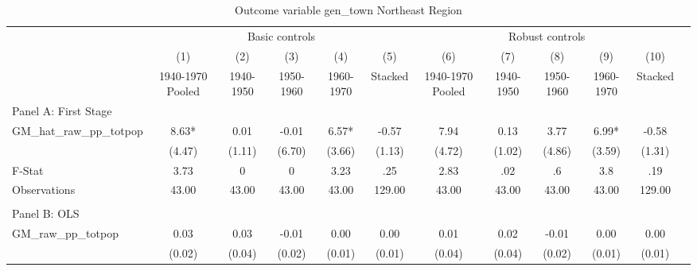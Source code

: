  \begin{table}[htbp]\centering {} \begin{threeparttable} \caption{Outcome variable gen\_town Northeast Region} \begin{tabular}{l*{11}{c}} \toprule
          &\multicolumn{5}{c}{Basic controls}                                   &\multicolumn{5}{c}{Robust controls}                                  \\\cmidrule(lr){2-6}\cmidrule(lr){7-11}
          &\multicolumn{1}{c}{(1)}&\multicolumn{1}{c}{(2)}&\multicolumn{1}{c}{(3)}&\multicolumn{1}{c}{(4)}&\multicolumn{1}{c}{(5)}&\multicolumn{1}{c}{(6)}&\multicolumn{1}{c}{(7)}&\multicolumn{1}{c}{(8)}&\multicolumn{1}{c}{(9)}&\multicolumn{1}{c}{(10)}\\
          &\multicolumn{1}{c}{1940-1970 Pooled}&\multicolumn{1}{c}{1940-1950}&\multicolumn{1}{c}{1950-1960}&\multicolumn{1}{c}{1960-1970}&\multicolumn{1}{c}{Stacked}&\multicolumn{1}{c}{1940-1970 Pooled}&\multicolumn{1}{c}{1940-1950}&\multicolumn{1}{c}{1950-1960}&\multicolumn{1}{c}{1960-1970}&\multicolumn{1}{c}{Stacked}\\
\cmidrule(lr){1-11}
\multicolumn{10}{l}{Panel A: First Stage}\\
\cmidrule(lr){1-11}
GM\_hat\_raw\_pp\_totpop&      8.63*  &      0.01   &     -0.01   &      6.57*  &     -0.57   &      7.94   &      0.13   &      3.77   &      6.99*  &     -0.58   \\
          &    (4.47)   &    (1.11)   &    (6.70)   &    (3.66)   &    (1.13)   &    (4.72)   &    (1.02)   &    (4.86)   &    (3.59)   &    (1.31)   \\
\midrule
F-Stat    &      3.73   &         0   &         0   &      3.23   &       .25   &      2.83   &       .02   &        .6   &       3.8   &       .19   \\
Observations&     43.00   &     43.00   &     43.00   &     43.00   &    129.00   &     43.00   &     43.00   &     43.00   &     43.00   &    129.00   \\
\cmidrule[\heavyrulewidth](lr){1-11} \\ \cmidrule[\heavyrulewidth](lr){1-11}
\multicolumn{10}{l}{Panel B: OLS}\\
\cmidrule(lr){1-11}
GM\_raw\_pp\_totpop&      0.03   &      0.03   &     -0.01   &      0.00   &      0.00   &      0.01   &      0.02   &     -0.01   &      0.00   &      0.00   \\
          &    (0.02)   &    (0.04)   &    (0.02)   &    (0.01)   &    (0.01)   &    (0.04)   &    (0.04)   &    (0.02)   &    (0.01)   &    (0.01)   \\

\end{tabular}
\end{threeparttable}
\end{table}
